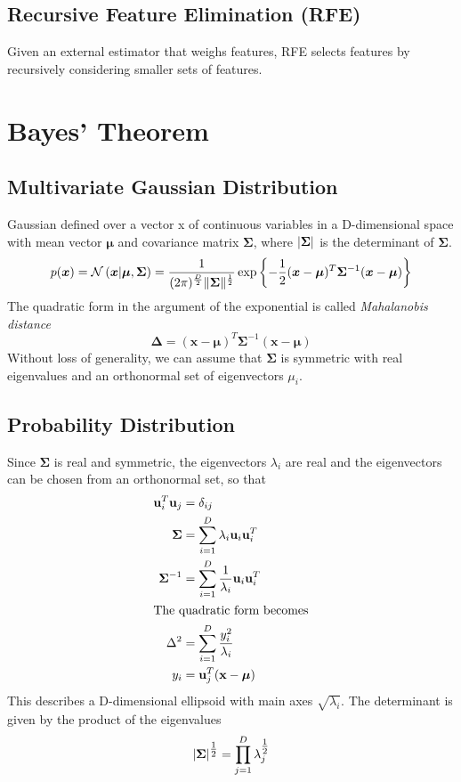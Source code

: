 \documentclass[11pt]{article}
\theoremstyle{definition}
\newcommand*\N[1]{\mathcal{N}\left(#1\right)}
\DeclarePairedDelimiter\abs{\lvert}{\rvert}
\DeclarePairedDelimiter\norm{\lVert}{\rVert}
\begin{document}
\subsection{Recursive Feature Elimination (RFE)}
Given an external estimator that weighs features, RFE selects features by recursively considering smaller sets of features.

\section{Bayes' Theorem}
\subsection{Multivariate Gaussian Distribution}
Gaussian defined over a vector x of continuous variables in a D-dimensional space with mean vector $\bm{\mu}$ and covariance matrix $\bm{\Sigma}$, where $ \abs{\bm{\Sigma}} $ is the determinant of $\bm{\Sigma}$.
\begin{equation*}
p(\bm{x}) = \N{\bm{x}|\bm{\mu}, \bm{\Sigma}} = \frac{1}{(2\pi)^{\frac{D}{2}} \norm{\bm{\Sigma}}^{\frac{1}{2}}} \exp\left\{ -\frac{1}{2} (\bm{x} - \bm{\mu})^T \bm{\Sigma}^{-1} (\bm{x} - \bm{\mu}) \right\}
\end{equation*}
The quadratic form in the argument of the exponential is called \emph{Mahalanobis distance}
\begin{equation*}
\bm{\Delta} = (\bm{x} - \bm{\mu})^T \bm{\Sigma}^{-1} (\bm{x} - \bm{\mu})
\end{equation*}
Without loss of generality, we can assume that $\bm{\Sigma}$ is symmetric with real eigenvalues and an orthonormal set of eigenvectors $\mu_i$.

\subsection{Probability Distribution}
Since $\bm{\Sigma}$ is real and symmetric, the eigenvectors $\lambda_i$ are real and the eigenvectors can be chosen from an orthonormal set, so that
\begin{align*}
	\textbf{u}_i^T \textbf{u}_j &= \delta_{ij}\\
	\bm{\Sigma} &= \sum_{i=1}^{D} \lambda_i \textbf{u}_i\textbf{u}_i^T\\
	\bm{\Sigma}^{-1} &= \sum_{i=1}^{D} \frac{1}{\lambda_i} \textbf{u}_i\textbf{u}_i^T\\
	\intertext{The quadratic form becomes}
	\Delta^2 &= \sum_{i=1}^{D}\frac{y_i^2}{\lambda_i}\\
	y_i &= \textbf{u}_j^T (\textbf{x} - \bm{\mu})
\end{align*}
This describes a D-dimensional ellipsoid with main axes $\sqrt{\lambda_i}$. The determinant is given by the product of the eigenvalues
\begin{equation*}
	\abs{\bm{\Sigma}}^{\tfrac{1}{2}} = \prod_{j=1}^{D} \lambda_j^{\tfrac{1}{2}}
\end{equation*}
\end{document}
